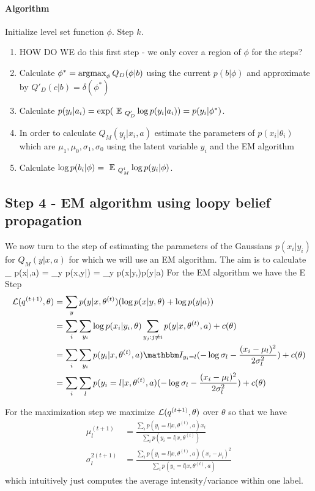 \documentclass{article} %
\begin{document}
\paragraph{Algorithm}
Initialize level set function $\phi$.
Step $k$.
\begin{enumerate}
\item HOW DO WE do this first step - we only cover a region of $\phi$ for the steps?
\item Calculate $\phi^* = \operatorname*{argmax}_{\phi} Q_D(\phi|b)$ using the current $p(b|\phi)$ and approximate by $Q'_D(c|b) = \delta(\phi^*)$
\item Calculate $p(y_i|a_i) = \exp(\mbox{ }\mathbb{E}\mbox{ }_{Q'_D} \log p(y_i|a_i))= p(y_i|\phi^*)$.
\item In order to calculate $Q_M(y_i|x_i,a)$ estimate the parameters of $p(x_i|\theta_i)$ which are $\mu_1,\mu_0,\sigma_1,\sigma_0$ using the latent variable $y_i$ and the EM algorithm
\item Calculate $\log p(b_i|\phi) = \mbox{ }\mathbb{E}\mbox{ }_{Q_M^i} \log p(y_i|\phi)$.
\end{enumerate} 

\subsection{Step 4 - EM algorithm using loopy belief propagation}
We now turn to the step of estimating the parameters of the Gaussians $p(x_i|y_i)$ for $Q_M(y|x,a)$ for which we will use an EM algorithm. The aim is to calculate 
\beqs
\max_{\theta} p(x|\theta,a) = \sum_y p(x,y|\theta) = \sum_y p(x|y,\theta)p(y|a)
\eeqs
For the EM algorithm we have the E Step
\begin{align*}
\L(q^{(t+1)},\theta) &= \sum_y p(y|x,\theta^{(t)}) (\log p(x|y,\theta) + \log p(y|a)) \\
&= \sum_i \sum_{y_i} \log p(x_i|y_i,\theta) \sum_{y_j:j\neq i} p(y|x,\theta^{(t)},a) + c(\theta)\\
&= \sum_i \sum_{y_i} p(y_i|x, \theta^{(t)},a) \Indi_{y_i=l} (-\log \sigma_l - \frac{(x_i -\mu_l)^2}{2\sigma_l^2}) + c(\theta)\\
&= \sum_i \sum_l p(y_i = l|x,\theta^{(t)},a) (-\log \sigma_l -  \frac{(x_i -\mu_l)^2}{2\sigma_l^2}) + c(\theta)
\end{align*}

For the maximization step we maximize $\mathcal{L}(q^{(t+1)},\theta)$ over $\theta$ so that we have
\begin{align*}
\mu_l^{(t+1)} &= \frac{\sum_i p(y_i=l|x,\theta^{(t)},a) x_i}{\sum_i p(y_i=l|x,\theta^{(t)})}\\
\sigma_l^{2(t+1)} &= \frac{\sum_i p(y_i =l | x,\theta^{(t)},a)(x_i-\mu_l)^2}{\sum_i p(y_i = l|x,\theta^{(t)},a)}
\end{align*}
which intuitively just computes the average intensity/variance within one label.
\end{document}
